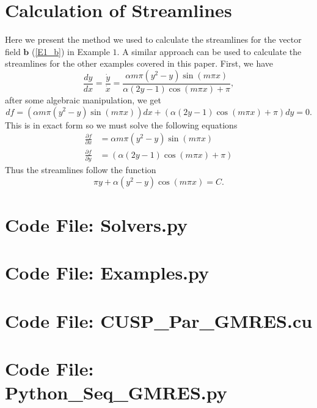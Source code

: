 \documentclass[12pt]{ociamthesis}
\begin{document}
\chapter{Calculation of Streamlines} \label{E1_Stream_Calc}
Here we present the method we used to calculate the streamlines for the vector field $\mathbf{b}$ (\ref{E1_b}) in Example $1$. A similar approach can be used to calculate the streamlines for the other examples covered in this paper. First, we have
\begin{equation}
\frac{dy}{dx} = \frac{\dot{y}}{\dot{x}} = 
\frac{\alpha m \pi (y^2-y)\sin(m \pi x)}{\alpha(2y-1)\cos(m\pi x) + \pi},
\end{equation}
after some algebraic manipulation, we get
\begin{equation}
df = (\alpha m\pi (y^2-y)\sin(m\pi x))dx + 
(\alpha(2y-1)\cos(m\pi x)+\pi)dy = 0.
\end{equation}
This is in exact form so we must solve the following equations
\begin{align}
\frac{\partial f}{\partial x} &= \alpha m\pi (y^2-y)\sin(m\pi x)\\
\frac{\partial f}{\partial y} &= (\alpha(2y-1)\cos(m\pi x)+\pi)
\end{align}
Thus the streamlines follow the function
\begin{equation}
\pi y + \alpha (y^2-y)\cos(m\pi x) = C.
\end{equation}

\chapter{Code File: Solvers.py} \label{CFSolve}

\chapter{Code File: Examples.py} \label{CFExample}

\chapter{Code File: CUSP\_Par\_GMRES.cu} \label{CFGPU}

\chapter{Code File: Python\_Seq\_GMRES.py} \label{CFCPU}
\end{document}
